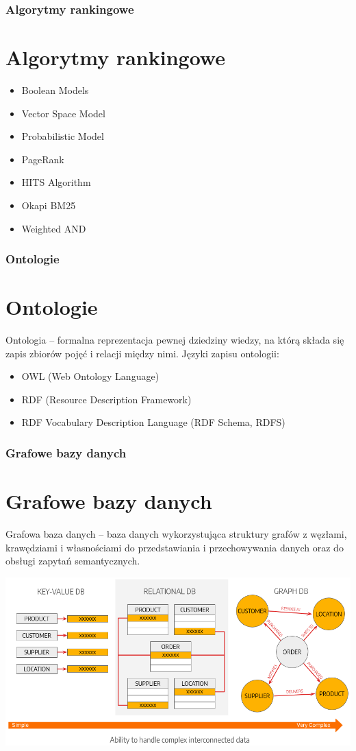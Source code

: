 \documentclass{beamer}
\begin{document}
	\begin{frame}
		\frametitle{Algorytmy rankingowe}
		\section{Algorytmy rankingowe}
		\begin{itemize}
			\item Boolean Models
			\item Vector Space Model
			\item Probabilistic Model
			\item PageRank
			\item HITS Algorithm
			\item Okapi BM25
			\item Weighted AND
		\end{itemize}
	\end{frame}

	\begin{frame}
		\frametitle{Ontologie}
		\section{Ontologie}
		Ontologia – formalna reprezentacja pewnej dziedziny wiedzy, na którą składa się zapis zbiorów pojęć i relacji między nimi.
		\newline
		\newline
		Języki zapisu ontologii:
		\begin{itemize}
			\item OWL (Web Ontology Language)
			\item RDF (Resource Description Framework)
			\item RDF Vocabulary Description Language (RDF Schema, RDFS)
		\end{itemize}
	\end{frame}

	\begin{frame}
		\frametitle{Grafowe bazy danych}
		\section{Grafowe bazy danych}
		Grafowa baza danych – baza danych wykorzystująca struktury grafów z węzłami, krawędziami i własnościami do przedstawiania i przechowywania danych oraz do obsługi zapytań semantycznych.
		\begin{center}
			\includegraphics[scale=0.30]{graph}
		\end{center}
	\end{frame}
\end{document}
